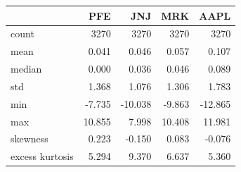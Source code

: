 \begin{tabular}{lrrrr}
\toprule
 & PFE & JNJ & MRK & AAPL \\
\midrule
count & 3270 & 3270 & 3270 & 3270 \\
mean & 0.041 & 0.046 & 0.057 & 0.107 \\
median & 0.000 & 0.036 & 0.046 & 0.089 \\
std & 1.368 & 1.076 & 1.306 & 1.783 \\
min & -7.735 & -10.038 & -9.863 & -12.865 \\
max & 10.855 & 7.998 & 10.408 & 11.981 \\
skewness & 0.223 & -0.150 & 0.083 & -0.076 \\
excess kurtosis & 5.294 & 9.370 & 6.637 & 5.360 \\
\bottomrule
\end{tabular}
